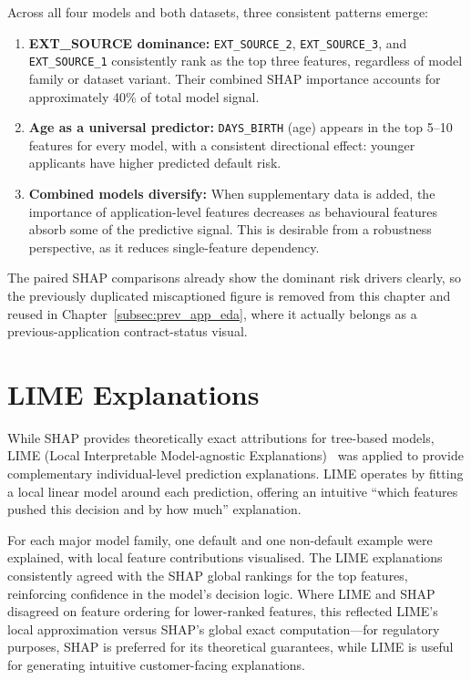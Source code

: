 Across all four models and both datasets, three consistent patterns emerge:

\begin{enumerate}
    \item \textbf{EXT\_SOURCE dominance:} \texttt{EXT\_SOURCE\_2}, \texttt{EXT\_SOURCE\_3}, and \texttt{EXT\_SOURCE\_1} consistently rank as the top three features, regardless of model family or dataset variant. Their combined SHAP importance accounts for approximately 40\% of total model signal.
    \item \textbf{Age as a universal predictor:} \texttt{DAYS\_BIRTH} (age) appears in the top 5--10 features for every model, with a consistent directional effect: younger applicants have higher predicted default risk.
    \item \textbf{Combined models diversify:} When supplementary data is added, the importance of application-level features decreases as behavioural features absorb some of the predictive signal. This is desirable from a robustness perspective, as it reduces single-feature dependency.
\end{enumerate}

The paired SHAP comparisons already show the dominant risk drivers clearly, so the previously duplicated miscaptioned figure is removed from this chapter and reused in Chapter~\ref{subsec:prev_app_eda}, where it actually belongs as a previous-application contract-status visual.

\section{LIME Explanations}
\label{sec:lime}

While SHAP provides theoretically exact attributions for tree-based models, LIME (Local Interpretable Model-agnostic Explanations)~\cite{ribeiro2016} was applied to provide complementary individual-level prediction explanations. LIME operates by fitting a local linear model around each prediction, offering an intuitive ``which features pushed this decision and by how much'' explanation.

For each major model family, one default and one non-default example were explained, with local feature contributions visualised. The LIME explanations consistently agreed with the SHAP global rankings for the top features, reinforcing confidence in the model's decision logic. Where LIME and SHAP disagreed on feature ordering for lower-ranked features, this reflected LIME's local approximation versus SHAP's global exact computation---for regulatory purposes, SHAP is preferred for its theoretical guarantees, while LIME is useful for generating intuitive customer-facing explanations.

